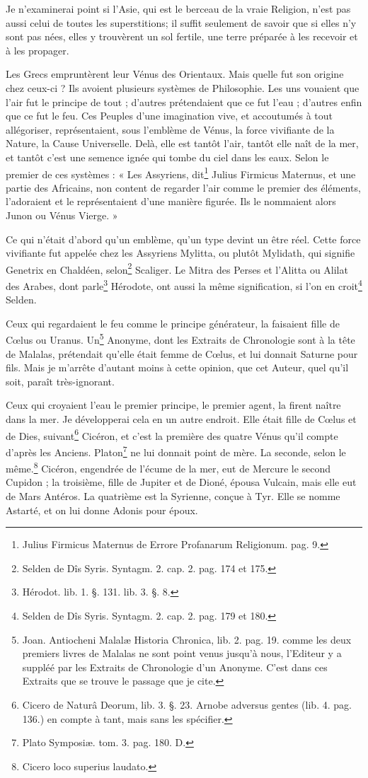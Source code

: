 \documentclass[a4paper, 11pt, oneside, polutonikogreek, french]{article}
\begin{document}
Je n'examinerai point si l'Asie, qui est le berceau de la vraie Religion, n'est pas aussi celui de toutes les superstitions; il suffit seulement de savoir que si elles n'y sont pas nées, elles y trouvèrent un sol fertile, une terre préparée à les recevoir et à les propager.

Les Grecs empruntèrent leur Vénus des Orientaux. Mais quelle fut son origine chez ceux-ci ? Ils avoient plusieurs systèmes de Philosophie. Les uns vouaient que l'air fut le principe de tout ; d'autres prétendaient que ce fut l'eau ; d'autres enfin que ce fut le feu. Ces Peuples d'une imagination vive, et accoutumés à tout allégoriser, représentaient, sous l'emblème de Vénus, la force vivifiante de la Nature, la Cause Universelle. Delà, elle est tantôt l'air, tantôt elle naît de la mer, et tantôt c'est une semence ignée qui tombe du ciel dans les eaux. Selon le premier de ces systèmes : « Les Assyriens, dit\footnote{Julius Firmicus Maternus de Errore Profanarum Religionum. pag. 9.} Julius Firmicus Maternus, et une partie des Africains, non content de regarder l'air comme le premier des éléments, l'adoraient et le représentaient d'une manière figurée. Ils le nommaient alors Junon ou Vénus Vierge. »

Ce qui n'était d'abord qu'un emblème, qu'un type devint un être réel. Cette force vivifiante fut appelée chez les Assyriens Mylitta, ou plutôt Mylidath, qui signifie Genetrix en Chaldéen, selon\footnote{Selden de Dîs Syris. Syntagm. 2. cap. 2. pag. 174 et 175.} Scaliger. Le Mitra des Perses et l'Alitta ou Alilat des Arabes, dont parle\footnote{Hérodot. lib. 1. §. 131. lib. 3. §. 8.} Hérodote, ont aussi la même signification, si l'on en croit\footnote{Selden de Dîs Syris. Syntagm. 2. cap. 2. pag. 179 et 180.} Selden.

Ceux qui regardaient le feu comme le principe générateur, la faisaient fille de Cœlus ou Uranus. Un\footnote{Joan. Antiocheni Malalæ Historia Chronica, lib. 2. pag. 19. comme les deux premiers livres de Malalas ne sont point venus jusqu'à nous, l'Editeur y a suppléé par les Extraits de Chronologie d'un Anonyme. C'est dans ces Extraits que se trouve le passage que je cite.} Anonyme, dont les Extraits de Chronologie sont à la tête de Malalas, prétendait qu'elle était femme de Cœlus, et lui donnait Saturne pour fils. Mais je m'arrête d'autant moins à cette opinion, que cet Auteur, quel qu'il soit, paraît très-ignorant.

Ceux qui croyaient l'eau le premier principe, le premier agent, la firent naître dans la mer. Je développerai cela en un autre endroit. Elle était fille de Cœlus et de Dies, suivant\footnote{Cicero de Naturâ Deorum, lib. 3. §. 23. Arnobe adversus gentes (lib. 4. pag. 136.) en compte à tant, mais sans les spécifier.} Cicéron, et c'est la première des quatre Vénus qu'il compte d'après les Anciens. Platon\footnote{Plato Symposiæ. tom. 3. pag. 180. D.} ne lui donnait point de mère. La seconde, selon le même.\footnote{Cicero loco superius laudato.} Cicéron, engendrée de l'écume de la mer, eut de Mercure le second Cupidon ; la troisième, fille de Jupiter et de Dioné, épousa Vulcain, mais elle eut de Mars Antéros. La quatrième est la Syrienne, conçue à Tyr. Elle se nomme Astarté, et on lui donne Adonis pour époux.
\end{document}
